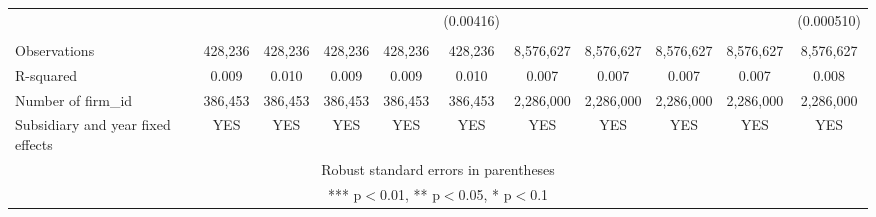 \begin{tabular}{lcccccccccc}
 &  &  &  &  & (0.00416) &  &  &  &  & (0.000510) \\
 &  &  &  &  &  &  &  &  &  &  \\
Observations & 428,236 & 428,236 & 428,236 & 428,236 & 428,236 & 8,576,627 & 8,576,627 & 8,576,627 & 8,576,627 & 8,576,627 \\
R-squared & 0.009 & 0.010 & 0.009 & 0.009 & 0.010 & 0.007 & 0.007 & 0.007 & 0.007 & 0.008 \\
Number of firm\_id & 386,453 & 386,453 & 386,453 & 386,453 & 386,453 & 2,286,000 & 2,286,000 & 2,286,000 & 2,286,000 & 2,286,000 \\
 Subsidiary and year fixed effects & YES & YES & YES & YES & YES & YES & YES & YES & YES & YES \\ \hline
\multicolumn{11}{c}{ Robust standard errors in parentheses} \\
\multicolumn{11}{c}{ *** p$<$0.01, ** p$<$0.05, * p$<$0.1} \\
\end{tabular}
